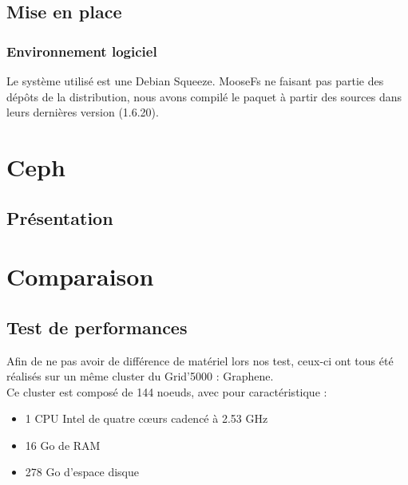 \documentclass[12pt]{report}
\begin{document}
		\section{Mise en place}
			\subsection{Environnement logiciel}

				Le système utilisé est une Debian Squeeze. MooseFs ne faisant pas partie des dépôts de la distribution,
				nous avons compilé le paquet à partir des sources dans leurs dernières version (1.6.20).

		


	\chapter{Ceph}
		\section{Présentation}

	\chapter{Comparaison}
		\section{Test de performances}
			Afin de ne pas avoir de différence de matériel lors nos test, ceux-ci ont tous été réalisés sur un même cluster du Grid'5000 : Graphene.\\

			Ce cluster est composé de 144 noeuds, avec pour caractéristique :
			\begin{itemize}
				\item 1 CPU Intel de quatre cœurs cadencé à 2.53 GHz
				\item 16 Go de RAM
				\item 278 Go d'espace disque\\
			\end{itemize}
\end{document}
